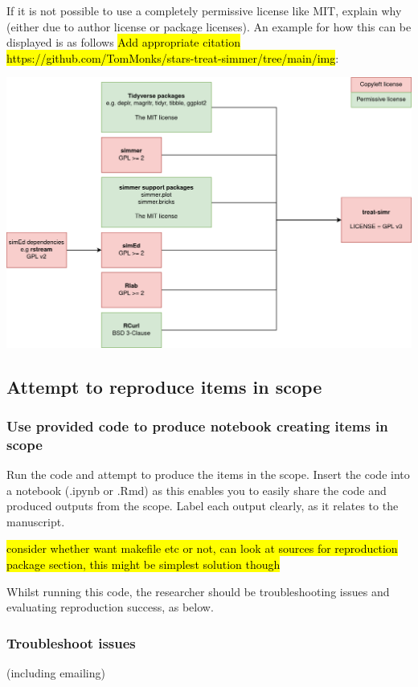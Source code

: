 If it is not possible to use a completely permissive license like MIT, explain why (either due to author license or package licenses). An example for how this can be displayed is as follows \hl{Add appropriate citation https://github.com/TomMonks/stars-treat-simmer/tree/main/img}:

\includegraphics[width=\linewidth]{images/license.png}

\subsection{Attempt to reproduce items in scope}

\subsubsection{Use provided code to produce notebook creating items in scope}

Run the code and attempt to produce the items in the scope. Insert the code into a notebook (.ipynb or .Rmd) as this enables you to easily share the code and produced outputs from the scope. Label each output clearly, as it relates to the manuscript.

\hl{consider whether want makefile etc or not, can look at sources for reproduction package section, this might be simplest solution though}

Whilst running this code, the researcher should be troubleshooting issues and evaluating reproduction success, as below.

\subsubsection{Troubleshoot issues}
\timeyes (including emailing)

